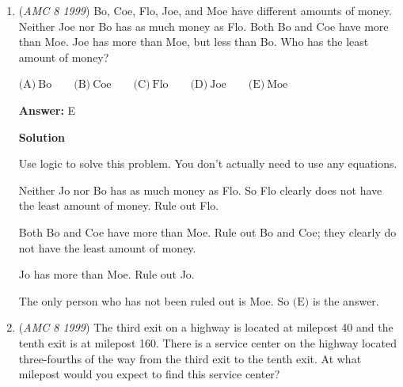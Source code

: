 \begin{enumerate}
 \textbf{Answer: }D



\textbf{Solution 1}

We need the same perimeter as a $60$ by $20$ rectangle, but the greatest area we can get. right now the perimeter is $160$. To get the greatest area while keeping a perimeter of $160$, the sides should all be $40$. that means an area of $1600$. Right now, the area is $20 \times 60$ which is $1200$. $1600-1200=400$ which is $\boxed{D}$.

 



\textbf{Solution 2}

We need the same perimeter as a $60$ by $20$ rectangle, but in a square. Right now the perimeter is $160$, since a square has equal sides and $160$ divided by 4 is $40$,  the sides should all be $40$, that means an area of $1600$. Before, the area is $20 \times 60$ which is $1200$. $1600-1200=400$ which is $\boxed{D}$. 

 


	\item (\textit{AMC 8 1999}) Bo, Coe, Flo, Joe, and Moe have different amounts of money. Neither Joe nor Bo has as much money as Flo. Both Bo and Coe have more than Moe. Joe has more than Moe, but less than Bo. Who has the least amount of money?


 $\text{(A)}\ \text{Bo} \qquad \text{(B)}\ \text{Coe} \qquad \text{(C)}\ \text{Flo} \qquad \text{(D)}\ \text{Joe} \qquad \text{(E)}\ \text{Moe}$

 \textbf{Answer: }E



\textbf{Solution}

Use logic to solve this problem. You don't actually need to use any equations.

 Neither Jo nor Bo has as much money as Flo. So Flo clearly does not have the least amount of money. Rule out Flo.

 Both Bo and Coe have more than Moe. Rule out Bo and Coe; they clearly do not have the least amount of money.

 Jo has more than Moe. Rule out Jo. 

 The only person who has not been ruled out is Moe. So $\boxed{\text{(E)}}$ is the answer.

 


 


	\item (\textit{AMC 8 1999}) The third exit on a highway is located at milepost 40 and the tenth exit is at milepost 160. There is a service center on the highway located three-fourths of the way from the third exit to the tenth exit. At what milepost would you expect to find this service center?



\end{enumerate}
